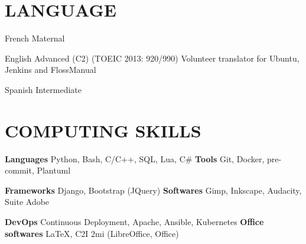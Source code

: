 \documentclass[11pt,a4paper]{moderncv}
\begin{document}






  \section{LANGUAGE}\label{sec:language}

  \cvlanguage
    {French}
    {Maternal}{}{}{}{}

  \cvlanguage
    {English}
    {Advanced (C2) (TOEIC 2013: 920/990)}
    {Volunteer translator for Ubuntu, Jenkins and FlossManual}

  \cvlanguage
    {Spanish}
    {Intermediate}
    {}{}{}{}

  \section{COMPUTING SKILLS}\label{sec:computing-skills}

  \cvcomputer
    {\textbf{Languages}}
    {Python, Bash, C/C++, SQL, Lua, C\#}
    {\textbf{Tools}}
    {Git, Docker, pre-commit, Plantuml}

  \cvcomputer
    {\textbf{Frameworks}}
    {Django, Bootstrap (JQuery)}
    {\textbf{Softwares}}
    {Gimp, Inkscape, Audacity, Suite Adobe}

  \cvcomputer
    {\textbf{DevOps}}
    {Continuous Deployment, Apache, Ansible, Kubernetes}
    {\textbf{Office softwares}}
    {\LaTeX{}, C2I 2mi (LibreOffice, Office)}
\end{document}
